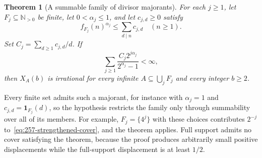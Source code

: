 \documentclass[11pt]{article}
\theoremstyle{plain}
\newtheorem{thm}{Theorem}[section]
\theoremstyle{definition}
\theoremstyle{remark}
\newcommand{\Npos}{\mathbb{N}_{>0}}
\begin{document}
\begin{thm}[A summable family of divisor majorants]\label{thm:257-variable-fractional-cover}
For each $j\ge1$, let $F_j\subseteq\Npos$ be finite, let
$0<\alpha_j\le1$, and let $c_{j,d}\ge0$ satisfy
\[
 f_{F_j}(n)^{\alpha_j}\le\sum_{d\mid n}c_{j,d}\quad(n\ge1).
\]
Set $C_j=\sum_{d\ge1}c_{j,d}/d$.  If
\begin{equation}
 \sum_{j\ge1}\frac{C_j2^{j\alpha_j}}{2^{\alpha_j}-1}<\infty,
 \label{eq:257-strengthened-cover}
\end{equation}
then $X_A(b)$ is irrational for every infinite
$A\subseteq\bigcup_jF_j$ and every integer $b\ge2$.
\end{thm}

Every finite set admits such a majorant, for instance with $\alpha_j=1$
and $c_{j,d}=\mathbf1_{F_j}(d)$, so the hypothesis restricts the family
only through summability over all of its members. For example,
$F_j=\{4^j\}$ with these choices contributes $2^{-j}$
to~\eqref{eq:257-strengthened-cover}, and the theorem applies. Full support
admits no cover satisfying the theorem, because the proof produces
arbitrarily small positive displacements while the full-support
displacement is at least $1/2$.
\end{document}
